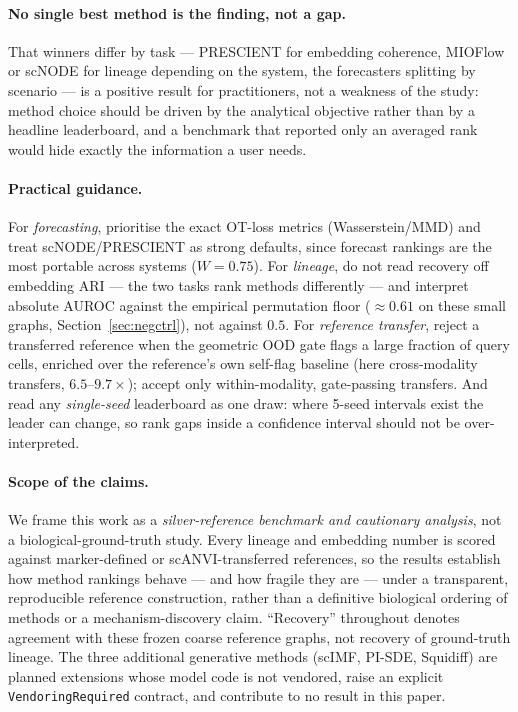 \documentclass[11pt]{article}
\newcommand{\code}[1]{\texttt{\small #1}}
\begin{document}
\paragraph{No single best method is the finding, not a gap.} That winners differ by task --- PRESCIENT for embedding coherence, MIOFlow or scNODE for lineage depending on the system, the forecasters splitting by scenario --- is a positive result for practitioners, not a weakness of the study: method choice should be driven by the analytical objective rather than by a headline leaderboard, and a benchmark that reported only an averaged rank would hide exactly the information a user needs.

\paragraph{Practical guidance.} For \emph{forecasting}, prioritise the exact OT-loss metrics (Wasserstein/MMD) and treat scNODE/PRESCIENT as strong defaults, since forecast rankings are the most portable across systems ($W=0.75$). For \emph{lineage}, do not read recovery off embedding ARI --- the two tasks rank methods differently --- and interpret absolute AUROC against the empirical permutation floor ($\approx0.61$ on these small graphs, Section~\ref{sec:negctrl}), not against $0.5$. For \emph{reference transfer}, reject a transferred reference when the geometric OOD gate flags a large fraction of query cells, enriched over the reference's own self-flag baseline (here cross-modality transfers, $6.5$--$9.7\times$); accept only within-modality, gate-passing transfers. And read any \emph{single-seed} leaderboard as one draw: where 5-seed intervals exist the leader can change, so rank gaps inside a confidence interval should not be over-interpreted.

\paragraph{Scope of the claims.} We frame this work as a \emph{silver-reference benchmark and cautionary analysis}, not a biological-ground-truth study. Every lineage and embedding number is scored against marker-defined or scANVI-transferred references, so the results establish how method rankings behave --- and how fragile they are --- under a transparent, reproducible reference construction, rather than a definitive biological ordering of methods or a mechanism-discovery claim. ``Recovery'' throughout denotes agreement with these frozen coarse reference graphs, not recovery of ground-truth lineage. The three additional generative methods (scIMF, PI-SDE, Squidiff) are planned extensions whose model code is not vendored, raise an explicit \code{VendoringRequired} contract, and contribute to no result in this paper.
\end{document}
